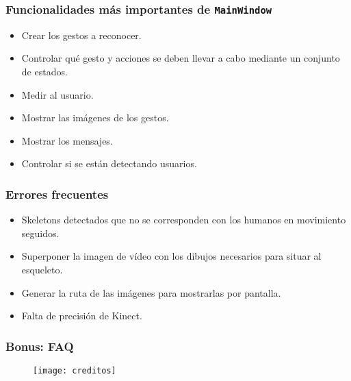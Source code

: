 \documentclass[leqno]{beamer}
\begin{document}
\begin{frame}
\frametitle{Funcionalidades más importantes de \texttt{MainWindow}}

\begin{itemize}
\item Crear los gestos a reconocer.
\item Controlar qué gesto y acciones se deben llevar a cabo mediante un conjunto de estados.
\item Medir al usuario.
\item Mostrar las imágenes de los gestos.
\item Mostrar los mensajes.
\item Controlar si se están detectando usuarios.
\end{itemize}
\end{frame}

\begin{frame}
\frametitle{Errores frecuentes}

\begin{itemize}
\item Skeletons detectados que no se corresponden con los humanos en movimiento seguidos.
\item Superponer la imagen de vídeo con los dibujos necesarios para situar al esqueleto.
\item Generar la ruta de las imágenes para mostrarlas por pantalla.
\item Falta de precisión de Kinect.
\end{itemize}
\end{frame}

\begin{frame}
\frametitle{Bonus: FAQ}

\begin{figure}[htb]
\centering
\texttt{[image: creditos]}
\end{figure}

\end{frame}
\end{document}
